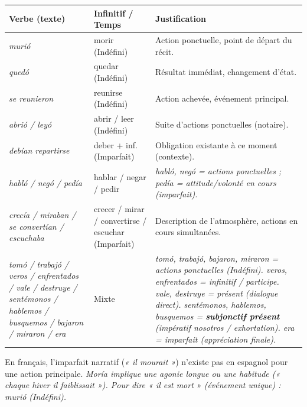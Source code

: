 \documentclass[11pt]{article}
\newcommand{\esp}[1]{\ifmmode\text{\textit{#1}}\else\begingroup\selectlanguage{spanish}\itshape #1\endgroup\fi}
\begin{document}
\begin{exemplebox}
\begin{center}
\begin{tabularx}{\linewidth}{|l|X|l|}
\hline
\rowcolor{popblueL} \textbf{Verbe (texte)} & \textbf{Infinitif / Temps} & \textbf{Justification} \\
\hline
\esp{murió} & morir (Indéfini) & Action ponctuelle, point de départ du récit. \\
\hline
\esp{quedó} & quedar (Indéfini) & Résultat immédiat, changement d'état. \\
\hline
\esp{se reunieron} & reunirse (Indéfini) & Action achevée, événement principal. \\
\hline
\esp{abrió / leyó} & abrir / leer (Indéfini) & Suite d'actions ponctuelles (notaire). \\
\hline
\esp{debían repartirse} & deber + inf. (Imparfait) & Obligation existante à ce moment (contexte). \\
\hline
\esp{habló / negó / pedía} & hablar / negar / pedir & \esp{habló, negó} = actions ponctuelles ; \esp{pedía} = attitude/volonté en cours (imparfait). \\
\hline
\esp{crecía / miraban / se convertían / escuchaba} & crecer / mirar / convertirse / escuchar (Imparfait) & Description de l'atmosphère, actions en cours simultanées. \\
\hline
\esp{tomó / trabajó / veros / enfrentados / vale / destruye / sentémonos / hablemos / busquemos / bajaron / miraron / era} & Mixte & \esp{tomó, trabajó, bajaron, miraron} = actions ponctuelles (Indéfini). \esp{veros, enfrentados} = infinitif / participe. \esp{vale, destruye} = présent (dialogue direct). \esp{sentémonos, hablemos, busquemos} = \textbf{subjonctif présent} (impératif \emph{nosotros} / exhortation). \esp{era} = imparfait (appréciation finale). \\
\hline
\end{tabularx}
\end{center}
\end{exemplebox}

\begin{attention}
En français, l'imparfait narratif (\emph{« il mourait »}) n'existe pas en espagnol pour une action principale. \esp{Moría} implique une agonie longue ou une habitude (\emph{« chaque hiver il faiblissait »}). Pour dire « il est mort » (événement unique) : \esp{murió} (Indéfini).
\end{attention}
\end{document}
